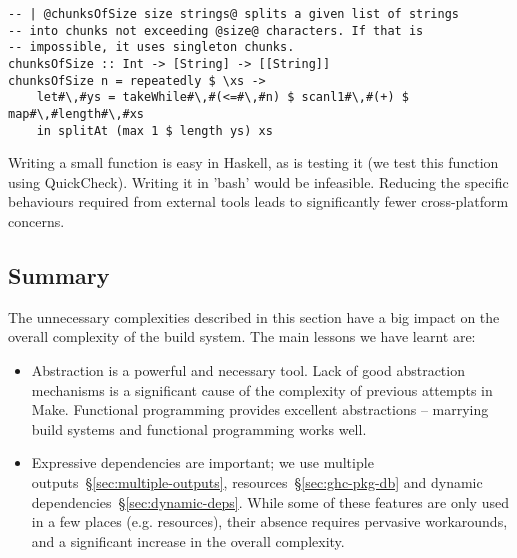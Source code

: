 \begin{lstlisting}
-- | @chunksOfSize size strings@ splits a given list of strings
-- into chunks not exceeding @size@ characters. If that is
-- impossible, it uses singleton chunks.
chunksOfSize :: Int -> [String] -> [[String]]
chunksOfSize n = repeatedly $ \xs ->
    let#\,#ys = takeWhile#\,#(<=#\,#n) $ scanl1#\,#(+) $ map#\,#length#\,#xs
    in splitAt (max 1 $ length ys) xs
\end{lstlisting}

\noindent Writing a small function is easy in Haskell, as is testing it
(we test this function using QuickCheck). Writing it in \lst'bash' would be infeasible.
Reducing the specific behaviours required from external tools leads to
significantly fewer cross-platform concerns.

\subsection{Summary}

The unnecessary complexities described in this section have a big impact on
the overall complexity of the build system. The main lessons we have learnt are:

\begin{itemize}
\item Abstraction is a powerful and necessary tool. Lack of good abstraction
mechanisms is a significant cause of the complexity of previous attempts in
Make. Functional programming provides excellent abstractions --
marrying build systems and functional programming works well.
\item Expressive dependencies are important; we use
multiple outputs~\S\ref{sec:multiple-outputs},
resources~\S\ref{sec:ghc-pkg-db} and dynamic dependencies~\S\ref{sec:dynamic-deps}.
While some of these
features are only used in a few places (e.g. resources), their absence
requires pervasive workarounds, and a significant increase in the overall complexity.
\end{itemize}

%
%
%
%
